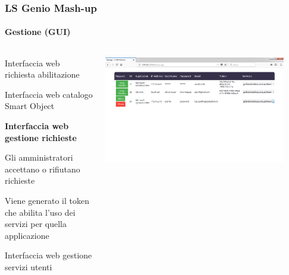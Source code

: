 \documentclass{beamer}
\begin{document}
\begin{frame}[noframenumbering]
\frametitle{LS Genio Mash-up}
\framesubtitle{Gestione (GUI)}
\begin{columns}[T] %
	\begin{column}{.3\textwidth}
		
		\begin{itemize}
			{\tiny
			\item Interfaccia web richiesta abilitazione
			\item Interfaccia web catalogo Smart Object
			\item \textbf{Interfaccia web gestione richieste}
			
			\begin{itemize}
				{\tiny
				\item Gli amministratori accettano o rifiutano richieste
				\item Viene generato il token che abilita l'uso dei servizi per quella applicazione
				}
			\end{itemize}
			
			\item Interfaccia web gestione servizi utenti
		}
		\end{itemize}
	
	\end{column}%
	\hfill%
	\begin{column}{.66\textwidth}
		\includegraphics[width=0.9\textwidth]{images/managePagePlatform.png}
	\end{column}%
\end{columns}
\end{frame}
\end{document}
